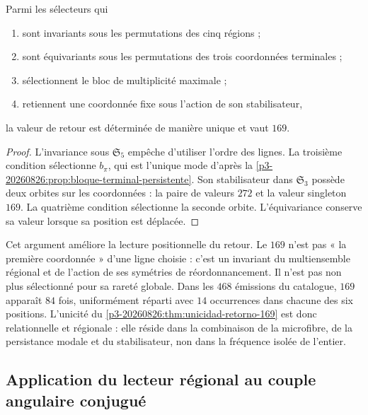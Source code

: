 \begin{theorem}
\label{p3-20260826:thm:unicidad-retorno-169}
Parmi les sélecteurs qui
\begin{enumerate}
  \item sont invariants sous les permutations des cinq régions ;
  \item sont équivariants sous les permutations des trois coordonnées
  terminales ;
  \item sélectionnent le bloc de multiplicité maximale ;
  \item retiennent une coordonnée fixe sous l'action de son stabilisateur,
\end{enumerate}
la valeur de retour est déterminée de manière unique et vaut \(169\).
\end{theorem}

\begin{proof}
L'invariance sous \(\mathfrak S_5\) empêche d'utiliser l'ordre des lignes. La
troisième condition sélectionne \(b_\pi\), qui est l'unique mode d'après la
\cref{p3-20260826:prop:bloque-terminal-persistente}. Son stabilisateur dans
\(\mathfrak S_3\) possède deux orbites sur les coordonnées : la paire de
valeurs \(272\) et la valeur singleton \(169\). La quatrième condition sélectionne la
seconde orbite. L'équivariance conserve sa valeur lorsque sa position est déplacée.
\end{proof}

Cet argument améliore la lecture positionnelle du retour. Le \(169\) n'est pas
« la première coordonnée » d'une ligne choisie : c'est un invariant du
multiensemble régional et de l'action de ses symétries de réordonnancement.
Il n'est pas non plus sélectionné pour sa rareté globale. Dans les \(468\) émissions du
catalogue, \(169\) apparaît \(84\) fois, uniformément réparti avec
\(14\) occurrences dans chacune des six positions. L'unicité du
\cref{p3-20260826:thm:unicidad-retorno-169} est donc relationnelle et régionale : elle réside
dans la combinaison de la microfibre, de la persistance modale et du stabilisateur, non dans la
fréquence isolée de l'entier.

\subsection{Application du lecteur régional au couple angulaire conjugué}
\label{sec:s102:c38:2:6}


